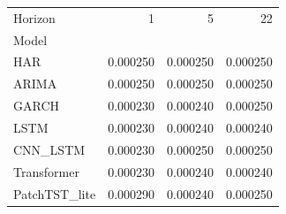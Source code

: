 \begin{tabular}{lrrr}
\toprule
Horizon & 1 & 5 & 22 \\
Model &  &  &  \\
\midrule
HAR & 0.000250 & 0.000250 & 0.000250 \\
ARIMA & 0.000250 & 0.000250 & 0.000250 \\
GARCH & 0.000230 & 0.000240 & 0.000250 \\
LSTM & 0.000230 & 0.000240 & 0.000240 \\
CNN_LSTM & 0.000230 & 0.000250 & 0.000250 \\
Transformer & 0.000230 & 0.000240 & 0.000240 \\
PatchTST_lite & 0.000290 & 0.000240 & 0.000250 \\
\bottomrule
\end{tabular}
